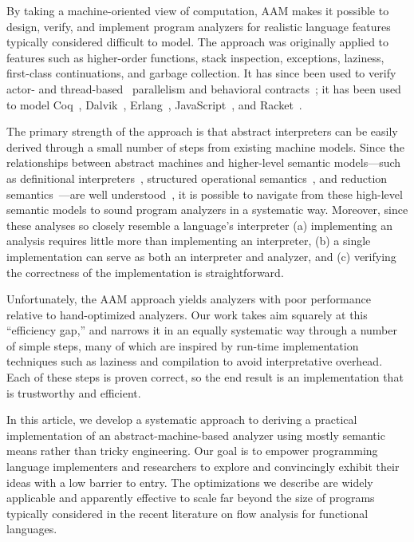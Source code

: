\documentclass[preprint,onecolumn,9pt]{sigplanconf} %
\begin{document}
%

By taking a
machine-oriented view of computation, AAM makes it possible to design,
verify, and implement program analyzers for realistic language
features typically considered difficult to model.  The approach was
originally applied to features such as higher-order functions,
stack inspection, exceptions, laziness, first-class continuations, and
garbage collection.  It has since been used to verify actor-
\cite{local:DOsualdo:12A} and
thread-based~\cite{dvanhorn:Might2011Family} parallelism and
behavioral contracts~\cite{dvanhorn:TobinHochstadt2012Higherorder}; it
has been used to model Coq~\cite{local:harvard},
Dalvik~\cite{local:dalvik}, Erlang~\cite{local:DOsualdo:12B},
JavaScript~\cite{local:DBLP:journals/corr/abs-1109-4467}, and
Racket~\cite{dvanhorn:TobinHochstadt2012Higherorder}.

The primary strength of the approach is that abstract interpreters can
be easily derived through a small number of steps from existing
machine models.  Since the relationships between abstract machines and
higher-level semantic models---such as definitional
interpreters~\cite{dvanhorn:reynolds-hosc98}, structured operational
semantics~\cite{dvanhorn:Plotkin1981Structural}, and reduction
semantics~\cite{dvanhorn:Felleisen2009Semantics}---are well
understood~\cite{dvanhorn:Danvy:DSc}, it is possible to navigate from
these high-level semantic models to sound program analyzers in a
systematic way.  Moreover, since these analyses so closely resemble a
language's interpreter (a) implementing an analysis requires little
more than implementing an interpreter, (b) a single implementation can
serve as both an interpreter and analyzer, and (c) verifying the
correctness of the implementation is straightforward.

Unfortunately, the AAM approach yields analyzers with poor performance
relative to hand-optimized analyzers.
%
Our work takes aim squarely at this ``efficiency gap,'' and narrows it
in an equally systematic way through a number of simple steps, many of
which are inspired by run-time implementation techniques such as
laziness and compilation to avoid interpretative overhead.  Each of
these steps is proven correct, so the end result is an implementation
that is trustworthy and efficient.

In this article, we develop a systematic approach to deriving a
practical implementation of an abstract-machine-based analyzer using
mostly semantic means rather than tricky engineering. Our goal is to
empower programming language implementers and researchers to explore
and convincingly exhibit their ideas with a low barrier to entry. The
optimizations we describe are widely applicable and apparently
effective to scale far beyond the size of programs typically considered
in the recent literature on flow analysis for functional languages.
\end{document}
